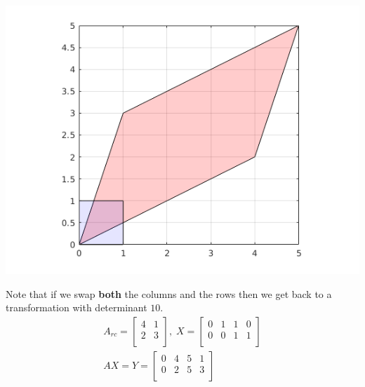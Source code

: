 \documentclass[MathsNotesBase.tex]{subfiles}
\begin{document}
{		\begin{center}
		\includegraphics[scale=0.85]{resources/img/GeometryOfMatrices_images/row_swap.png}
		\end{center}
		
		Note that if we swap \textbf{both} the columns and the rows then we get back to a transformation with determinant $10$.
		\begin{align*}
		A_{rc} =
		\begin{bmatrix}    
		4  &   1 \\
		2  &   3 \\		
		\end{bmatrix}
		,\; X = 
		\begin{bmatrix}  
		0   &  1  &   1  &   0 \\
		0   &  0  &   1  &   1	\\	
		\end{bmatrix} \\[10pt]
		AX = Y = 
		\begin{bmatrix}   
		0  &   4  &   5  &   1 \\
		0  &   2  &   5  &   3	\\
		\end{bmatrix}
		\end{align*}
		
}
\end{document}
